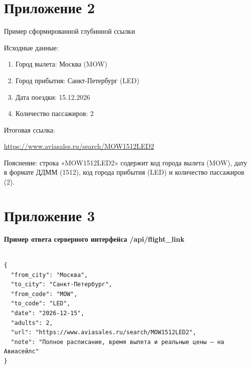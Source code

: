 \documentclass[14pt,a4paper,oneside]{extreport}
\begin{document}

\section*{Приложение 2}

Пример сформированной глубинной ссылки

Исходные данные:

\begin{enumerate}

  \item Город вылета: Москва (MOW)

  \item Город прибытия: Санкт-Петербург (LED)

  \item Дата поездки: 15.12.2026

  \item Количество пассажиров: 2

\end{enumerate}

Итоговая ссылка:

\url{https://www.aviasales.ru/search/MOW1512LED2}

Пояснение: строка «MOW1512LED2» содержит код города вылета (MOW), дату в формате ДДММ (1512), код города прибытия (LED) и количество пассажиров (2).


\section*{Приложение 3}

\par\noindent\textbf{Пример ответа серверного интерфейса /api/flight\_link}\par\vspace{4pt}

\begin{Verbatim}[fontsize=\small,frame=single,xleftmargin=6pt]

{
  "from_city": "Москва",
  "to_city": "Санкт-Петербург",
  "from_code": "MOW",
  "to_code": "LED",
  "date": "2026-12-15",
  "adults": 2,
  "url": "https://www.aviasales.ru/search/MOW1512LED2",
  "note": "Полное расписание, время вылета и реальные цены — на Авиасейлс"
}

\end{Verbatim}
\end{document}
